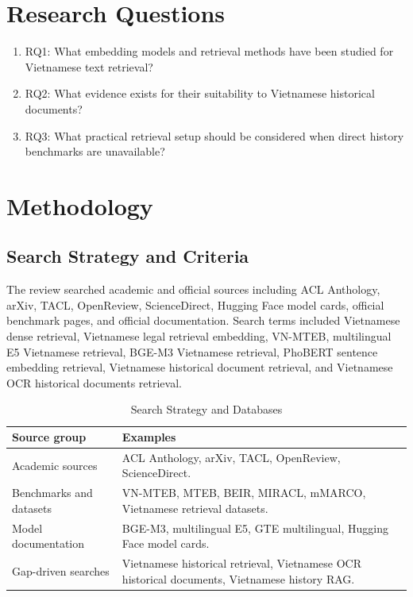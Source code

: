 \documentclass[11pt]{article}
\begin{document}
\section{Research Questions}
\begin{enumerate}
\item RQ1: What embedding models and retrieval methods have been studied for Vietnamese text retrieval?
\item RQ2: What evidence exists for their suitability to Vietnamese historical documents?
\item RQ3: What practical retrieval setup should be considered when direct history benchmarks are unavailable?
\end{enumerate}

\section{Methodology}
\subsection{Search Strategy and Criteria}
The review searched academic and official sources including ACL Anthology, arXiv, TACL, OpenReview, ScienceDirect, Hugging Face model cards, official benchmark pages, and official documentation. Search terms included Vietnamese dense retrieval, Vietnamese legal retrieval embedding, VN-MTEB, multilingual E5 Vietnamese retrieval, BGE-M3 Vietnamese retrieval, PhoBERT sentence embedding retrieval, Vietnamese historical document retrieval, and Vietnamese OCR historical documents retrieval.

\begin{table}[H]
\centering
\caption{Search Strategy and Databases}
\label{tab:search}
\small
\begin{tabularx}{\textwidth}{p{}Y}
\toprule
Source group & Examples \\
\midrule
Academic sources & ACL Anthology, arXiv, TACL, OpenReview, ScienceDirect. \\
Benchmarks and datasets & VN-MTEB, MTEB, BEIR, MIRACL, mMARCO, Vietnamese retrieval datasets. \\
Model documentation & BGE-M3, multilingual E5, GTE multilingual, Hugging Face model cards. \\
Gap-driven searches & Vietnamese historical retrieval, Vietnamese OCR historical documents, Vietnamese history RAG. \\
\bottomrule
\end{tabularx}
\end{table}
\end{document}
